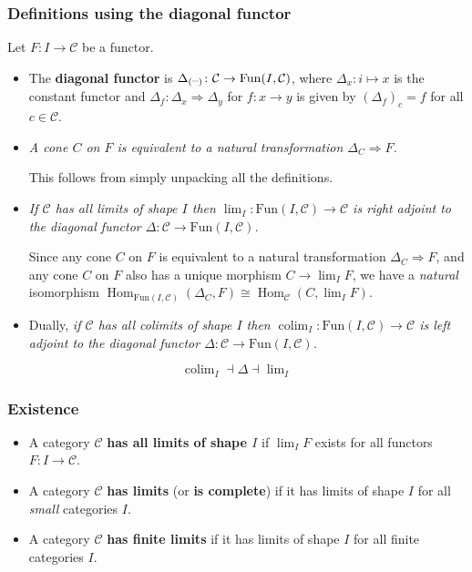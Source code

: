 \documentclass[10pt]{article}
\newcommand{\ccat}{\mathcal{C}}
\newcommand{\nt}{\Rightarrow}
\newcommand{\Fun}{\mathrm{Fun}}
\newcommand{\blank}{\hbox{--}}
\DeclareMathOperator{\Hom}{Hom}
\DeclareMathOperator*{\colim}{colim}
\begin{document}
            \subsubsection{Definitions using the diagonal functor}

                Let $F\colon I\to\ccat$ be a functor.

                \begin{itemize}
                    \item The \textbf{diagonal functor} is $\Delta_{(\blank)}\colon\ccat\to\Fun(I,\ccat)$, where $\Delta_x\colon i\mapsto x$ is the constant functor and $\Delta_f\colon\Delta_x\nt\Delta_y$ for $f\colon x\to y$ is given by $(\Delta_f)_c=f$ for all $c\in\ccat$.
                    \item \emph{A cone $C$ on $F$ is equivalent to a natural transformation $\Delta_C\nt F$.}

                        This follows from simply unpacking all the definitions.

                    \item \emph{If $\ccat$ has all limits of shape $I$ then $\lim_I\colon\Fun(I,\ccat)\to\ccat$ is \emph{right adjoint} to the diagonal functor $\Delta\colon\ccat\to\Fun(I,\ccat)$.}

                        Since any cone $C$ on $F$ is equivalent to a natural transformation $\Delta_C\nt F$, and any cone $C$ on $F$ also has a unique morphism $C\to\lim_I F$, we have a \emph{natural} isomorphism $\Hom_{\Fun(I,\ccat)}(\Delta_C,F)\cong\Hom_\ccat(C,\lim_I F)$.
                    \item Dually, \emph{if $\ccat$ has all colimits of shape $I$ then $\colim_I\colon\Fun(I,\ccat)\to\ccat$ is \emph{left adjoint} to the diagonal functor $\Delta\colon\ccat\to\Fun(I,\ccat)$.}
                \end{itemize}
                \begin{equation*}
                    \colim\nolimits_I \dashv \Delta \dashv \lim\nolimits_I
                \end{equation*}

            \subsubsection{Existence}

                \begin{itemize}
                    \item A category $\ccat$ \textbf{has all limits of shape $I$} if $\lim_I F$ exists for all functors $F\colon I\to\ccat$.
                    \item A category $\ccat$ \textbf{has limits} (or \textbf{is complete}) if it has limits of shape $I$ for all \emph{small} categories $I$.
                    \item A category $\ccat$ \textbf{has finite limits} if it has limits of shape $I$ for all finite categories $I$.
                \end{itemize}
\end{document}
